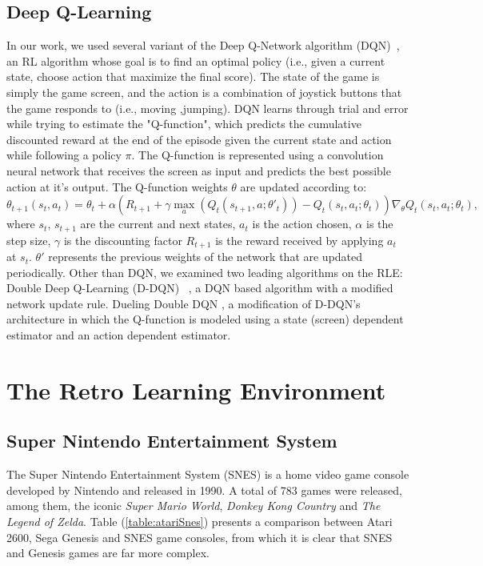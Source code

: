 \documentclass{article}
\begin{document}
\subsection{Deep Q-Learning}
In our work, we used several variant of the Deep Q-Network algorithm (DQN)~\citep{mnih2015human}, an RL algorithm whose goal is to find an optimal policy (i.e., given a current state, choose action that maximize the final score). The state of the game is simply the game screen, and the action is a combination of joystick buttons that the game responds to (i.e., moving ,jumping). DQN learns through trial and error while trying to estimate the "Q-function", which predicts the cumulative discounted reward at the end of the episode given the current state and action while following a policy $\pi$. The Q-function is represented using a convolution neural network that receives the screen as input and predicts the best possible action at it's output. The Q-function weights $\theta$ are updated according to:
\begin{equation}
\theta_{t+1}(s_t,a_t) = \theta_t+\alpha(R_{t+1} +\gamma  \max_a(Q_t(s_{t+1},a;\theta'_t))-Q_t(s_t,a_t;\theta_t))\nabla_\theta Q_t(s_t,a_t;\theta_t),
\end{equation}
where $s_t$, $s_{t+1}$ are the current and next states, $a_t$ is the action chosen, $\alpha$ is the step size, $\gamma$ is the discounting factor $R_{t+1}$ is the reward received by applying $a_t$ at $s_t$. $\theta'$ represents the previous weights of the network that are updated periodically.
Other than DQN, we examined two leading algorithms on the RLE: Double Deep Q-Learning (D-DQN) ~\citep{van2015deep}, a DQN based algorithm with a modified network update rule. Dueling Double DQN \citep{wang2015dueling}, a modification of D-DQN's architecture in which the Q-function is modeled using a state (screen) dependent estimator and an action dependent estimator. 


\section{The Retro Learning Environment}
\subsection{Super Nintendo Entertainment System}
The Super Nintendo Entertainment System (SNES) is a home video game console developed by Nintendo and released in 1990. 
A total of 783 games were released, among them, the iconic \textit{Super Mario World}, \textit{Donkey Kong Country} and \textit{The Legend of Zelda}. 
Table (\ref{table:atariSnes}) presents a comparison between Atari 2600, Sega Genesis and SNES game consoles, from which it is clear that SNES and Genesis games are far more complex. 
\end{document}
